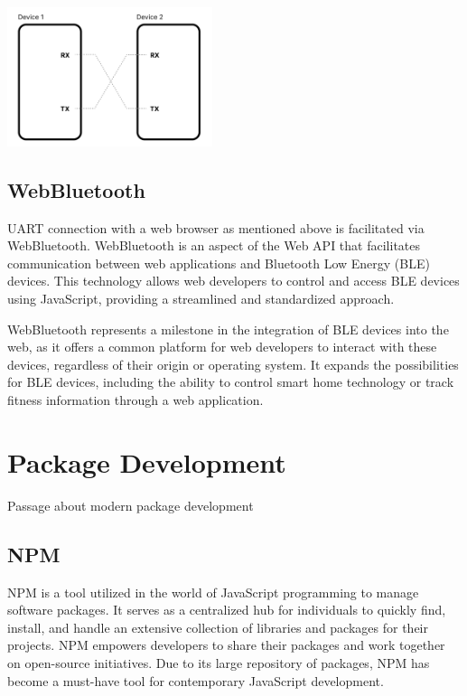 \documentclass{l4proj}
\begin{document}
\begin{center}
    \includegraphics[width=60mm,scale=0.5]{dissertation/images/UART_diagram.png}
\end{center}




\subsection{WebBluetooth}
\text UART connection with a web browser as mentioned above is facilitated via WebBluetooth. WebBluetooth is an aspect of the Web API that facilitates communication between web applications and Bluetooth Low Energy (BLE) devices. This technology allows web developers to control and access BLE devices using JavaScript, providing a streamlined and standardized approach.

WebBluetooth represents a milestone in the integration of BLE devices into the web, as it offers a common platform for web developers to interact with these devices, regardless of their origin or operating system. It expands the possibilities for BLE devices, including the ability to control smart home technology or track fitness information through a web application.

\section{Package Development}

Passage about modern package development

\subsection{NPM}
\text NPM is a tool utilized in the world of JavaScript programming to manage software packages. It serves as a centralized hub for individuals to quickly find, install, and handle an extensive collection of libraries and packages for their projects. NPM empowers developers to share their packages and work together on open-source initiatives. Due to its large repository of packages, NPM has become a must-have tool for contemporary JavaScript development.
\end{document}
